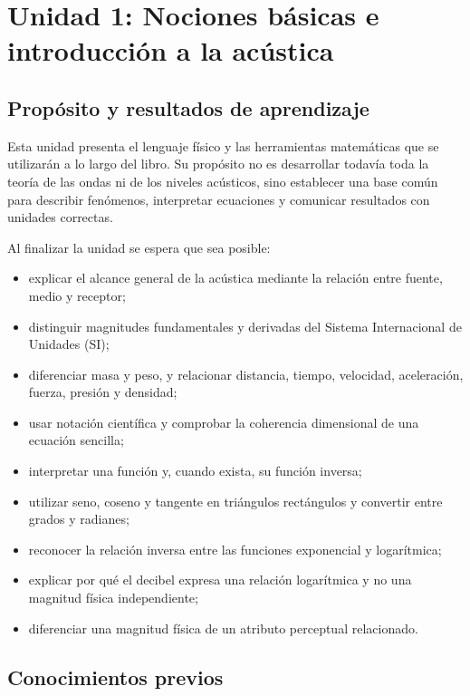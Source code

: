 \chapter{Unidad 1: Nociones básicas e introducción a la acústica}
\label{chap:unidad-1}

\section{Propósito y resultados de aprendizaje}
\label{sec:u1-proposito}

Esta unidad presenta el lenguaje físico y las herramientas matemáticas que se utilizarán a lo largo del libro. Su propósito no es desarrollar todavía toda la teoría de las ondas ni de los niveles acústicos, sino establecer una base común para describir fenómenos, interpretar ecuaciones y comunicar resultados con unidades correctas.

Al finalizar la unidad se espera que sea posible:

\begin{itemize}
    \item explicar el alcance general de la acústica mediante la relación entre fuente, medio y receptor;
    \item distinguir magnitudes fundamentales y derivadas del Sistema Internacional de Unidades (SI);
    \item diferenciar masa y peso, y relacionar distancia, tiempo, velocidad, aceleración, fuerza, presión y densidad;
    \item usar notación científica y comprobar la coherencia dimensional de una ecuación sencilla;
    \item interpretar una función y, cuando exista, su función inversa;
    \item utilizar seno, coseno y tangente en triángulos rectángulos y convertir entre grados y radianes;
    \item reconocer la relación inversa entre las funciones exponencial y logarítmica;
    \item explicar por qué el decibel expresa una relación logarítmica y no una magnitud física independiente;
    \item diferenciar una magnitud física de un atributo perceptual relacionado.
\end{itemize}

\section{Conocimientos previos}
\label{sec:u1-previos}

